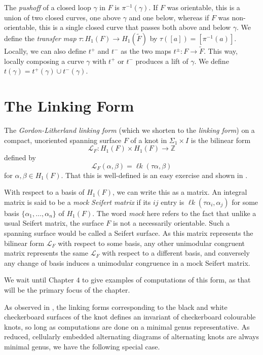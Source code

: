 \documentclass[12pt]{report}
\newcommand{\Z}{\mathbb{Z}}
\newcommand{\lk}{\operatorname{\ell\textit{k}}}
\begin{document}
The \textit{pushoff} of a closed loop $\gamma$ in $F$ is $\pi^{-1}(\gamma)$. If $F$ was orientable, this is a union of two closed curves, one above $\gamma$ and one below, whereas if $F$ was non-orientable, this is a single closed curve that passes both above and below $\gamma$. We define the \textit{transfer map} $\tau: H_{1}(F) \longrightarrow H_{1}(\widetilde{F})$ by $\tau([a]) = [\pi^{-1}(a)]$. Locally, we can also define $t^{+}$ and $t^{-}$ as the two maps $t^{\pm}: F \longrightarrow \widetilde{F}$. This way, locally composing a curve $\gamma$ with $t^{+}$ or $t^{-}$ produces a lift of $\gamma$. We define $t(\gamma) = t^{+}(\gamma) \cup t^{-}(\gamma)$.

\section{The Linking Form}
The \textit{Gordon-Litherland linking form} (which we shorten to the \textit{linking form}) on a compact, unoriented spanning surface $F$ of a knot in $\Sigma_{1} \times I$ is the bilinear form
\[\mathcal{L}_{F}: H_{1}(F) \times H_{1}(F) \longrightarrow \Z\]
defined by
\[\mathcal{L}_{F}(\alpha, \beta) = \lk(\tau\alpha, \beta)\]
for $\alpha, \beta \in H_{1}(F)$. That this is well-defined is an easy exercise and shown in \cite[Chapter 2]{alternating-links-thickened-surfaces}. 

With respect to a basis of $H_{1}(F)$, we can write this as a matrix. An integral matrix is said to be a \textit{mock Seifert matrix} if its $ij$ entry is $\lk(\tau \alpha_{i}, \alpha_{j})$ for some basis $\{\alpha_{1}, \dots, \alpha_{n}\}$ of $H_{1}(F)$. The word \textit{mock} here refers to the fact that unlike a usual Seifert matrix, the surface $F$ is not a necessarily orientable. Such a spanning surface would be called a Seifert surface. As this matrix represents the bilinear form $\mathcal{L}_{F}$ with respect to some basis, any other unimodular congruent matrix represents the same $\mathcal{L}_{F}$ with respect to a different basis, and conversely any change of basis induces a unimodular congruence in a mock Seifert matrix.

We wait until Chapter $4$ to give examples of computations of this form, as that will be the primary focus of the chapter.

As observed in \cite[Section 3]{gordon-litherland-pairing-thickened-surfaces}, the linking forms corresponding to the black and white checkerboard surfaces of the knot defines an invariant of checkerboard colourable knots, so long as computations are done on a minimal genus representative. As reduced, cellularly embedded alternating diagrams of alternating knots are always minimal genus, we have the following special case.
\end{document}
